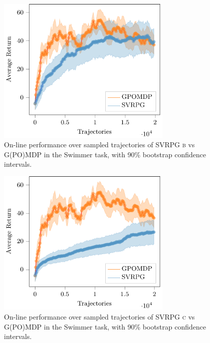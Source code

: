 \begin{figure}[h]
	\begin{minipage}[h]{1\textwidth}
		\centering
		\includegraphics[width=0.75\textwidth]{Images/Experiments/swimmer_SVRPG_vs_GPOMDP_B.pdf}
		\vspace{-0.1in}
		\caption{On-line performance over sampled trajectories of \acs{SVRPG} \textsc{b} vs G(PO)MDP in the Swimmer task, with 90\% bootstrap confidence intervals.}
		\label{fig:swimmerfive}
	\end{minipage}
	\vspace{-0.15in}
\end{figure}

\begin{figure}[h]
	\begin{minipage}[h]{1\textwidth}
		\centering
		\includegraphics[width=0.75\textwidth]{Images/Experiments/swimmer_SVRPG_vs_GPOMDP_C.pdf}
		\vspace{-0.1in}
		\caption{On-line performance over sampled trajectories of \acs{SVRPG} \textsc{c} vs G(PO)MDP in the Swimmer task, with 90\% bootstrap confidence intervals.}
		\label{fig:swimmerfour}
	\end{minipage}
	\vspace{-0.15in}
\end{figure}

